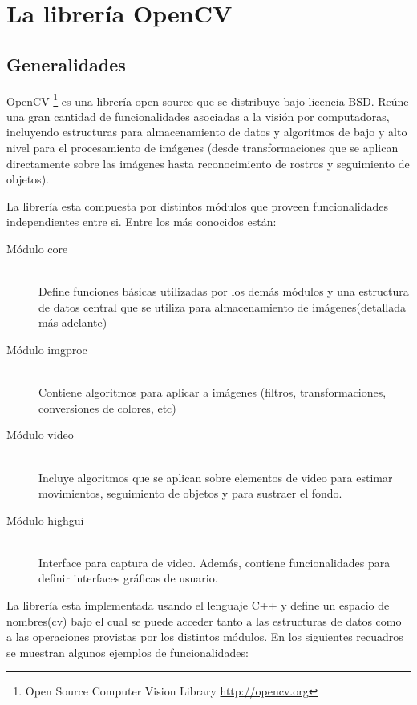 \documentclass[a4paper,10pt]{report}
\begin{document}
\chapter{La librería OpenCV}

\section{Generalidades}
OpenCV \footnote{Open Source Computer Vision Library \url{http://opencv.org}} es una librería open-source que se distribuye bajo licencia BSD. 
Reúne una gran cantidad de funcionalidades asociadas a la visión por computadoras, incluyendo estructuras para almacenamiento de datos y algoritmos de bajo y alto
nivel para el procesamiento de imágenes (desde transformaciones que se aplican directamente sobre las imágenes hasta reconocimiento de rostros y seguimiento de objetos).


La librería esta compuesta por distintos módulos que proveen funcionalidades independientes entre si. Entre los más conocidos están:

\begin{description}
 \item[Módulo core] \hfill \\Define funciones básicas utilizadas por los demás módulos y una estructura de datos central que se utiliza para almacenamiento de imágenes(detallada más adelante)  
 \item[Módulo imgproc] \hfill \\Contiene algoritmos para aplicar a imágenes (filtros, transformaciones, conversiones de colores, etc)
 \item[Módulo video]\hfill \\ Incluye algoritmos que se aplican sobre elementos de video para estimar movimientos, seguimiento de objetos y para sustraer el fondo.
 \item[Módulo highgui]\hfill \\ Interface para captura de video. Además, contiene funcionalidades para definir interfaces gráficas de usuario.
\end{description}


  
La librería esta implementada usando el lenguaje C++ y define un espacio de nombres(cv) bajo el cual se puede acceder tanto a las estructuras de datos como a las operaciones provistas por los distintos módulos.
En los siguientes recuadros se muestran algunos ejemplos de funcionalidades:
\end{document}
